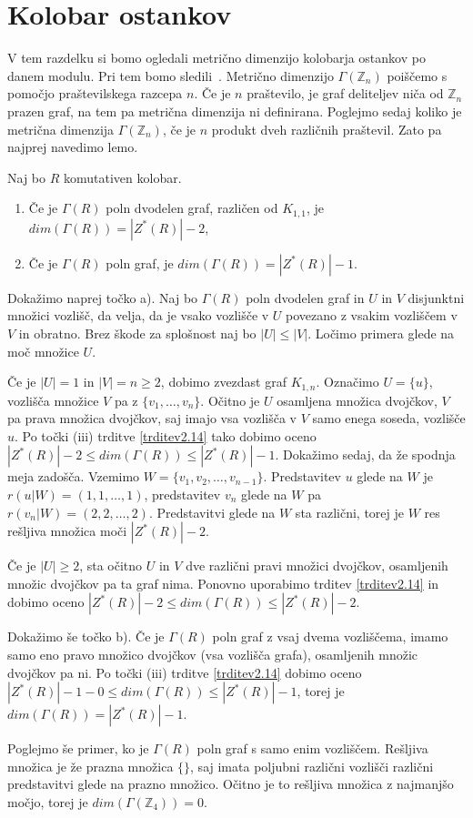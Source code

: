 \documentclass[mat1, tisk]{fmfdelo}
\newcommand{\Z}{\mathbb Z}
\begin{document}
\section{Kolobar ostankov}
V tem razdelku si bomo ogledali metrično dimenzijo kolobarja ostankov po danem modulu. 
Pri tem bomo sledili~\cite{3pirzada14}. Metrično dimenzijo $\Gamma(\Z_{n})$ poiščemo 
s pomočjo praštevilskega razcepa $n$. Če je $n$ praštevilo, je graf deliteljev 
niča od $\Z_{n}$ prazen graf, na tem pa metrična dimenzija ni definirana. Poglejmo sedaj 
koliko je metrična dimenzija $\Gamma(\Z_{n})$, če je $n$ produkt dveh različnih praštevil. 
Zato pa najprej navedimo lemo.
%
\begin{lema}\label{lema3.1}
  Naj bo $R$ komutativen kolobar.
  \begin{enumerate}[label=({\alph*})]
    \item Če je $\Gamma(R)$ poln dvodelen graf, različen od $K_{1,1}$, je $dim(\Gamma(R)) = |Z^*(R)| - 2$,
    \item Če je $\Gamma(R)$ poln graf, je $dim(\Gamma(R)) = |Z^*(R)| - 1$.
    \end{enumerate}
\end{lema}
\begin{dokaz}
  Dokažimo naprej točko a).
  Naj bo $\Gamma(R)$ poln dvodelen graf in $U$ in $V$ disjunktni množici vozlišč, da velja, da je 
  vsako vozlišče v $U$ povezano z vsakim vozliščem v $V$ in obratno. 
  Brez škode za splošnost naj bo $|U| \leq |V|$. Ločimo primera glede na moč množice $U$.

  Če je $|U| = 1$ in $|V| = n \geq 2$, dobimo zvezdast graf $K_{1,n}$. Označimo $U = \{u\}$, vozlišča množice 
  $V$ pa z $\{v_1, \ldots, v_n\}$. Očitno je $U$ osamljena množica dvojčkov, $V$ pa prava množica dvojčkov, 
  saj imajo vsa vozlišča v $V$ samo enega soseda, vozlišče $u$. Po točki (iii) trditve \ref{trditev2.14} tako 
  dobimo oceno $|Z^*(R)| - 2 \leq dim(\Gamma(R)) \leq |Z^*(R)| - 1$. Dokažimo sedaj, da že spodnja meja   
  zadošča. Vzemimo $W = \{v_1, v_2, \ldots, v_{n-1}\}$. Predstavitev $u$ glede na $W$ je 
  $r(u|W)=( 1, 1, \ldots, 1 )$, predstavitev $v_n$ glede na $W$ pa $r(v_n|W)=( 2, 2, \ldots, 2 )$. 
  Predstavitvi glede na $W$ sta različni, torej 
  je $W$ res rešljiva množica moči $|Z^*(R)| - 2$.

  Če je $|U| \geq 2$, sta očitno $U$ in $V$ dve različni pravi množici dvojčkov, osamljenih množic dvojčkov 
  pa ta graf nima. Ponovno uporabimo trditev \ref{trditev2.14} in dobimo oceno 
  $|Z^*(R)| - 2 \leq dim(\Gamma(R)) \leq |Z^*(R)| - 2$.

  Dokažimo še točko b). Če je $\Gamma(R)$ poln graf z vsaj dvema vozliščema, imamo samo eno pravo 
  množico dvojčkov (vsa vozlišča grafa), 
  osamljenih množic dvojčkov pa ni. Po točki (iii) trditve \ref{trditev2.14} dobimo oceno 
  $|Z^*(R)| - 1 - 0 \leq dim(\Gamma(R)) \leq |Z^*(R)| - 1$, torej je $dim(\Gamma(R)) = |Z^*(R)| - 1$.
  
  Poglejmo še primer, ko je $\Gamma(R)$ poln graf s samo enim vozliščem. Rešljiva množica 
  je že prazna množica $\{\}$, saj imata poljubni različni vozlišči
  različni predstavitvi glede na prazno množico. Očitno je to rešljiva množica z najmanjšo močjo, torej je 
  $dim(\Gamma(\Z_{4})) = 0$.
\end{dokaz}
\end{document}
